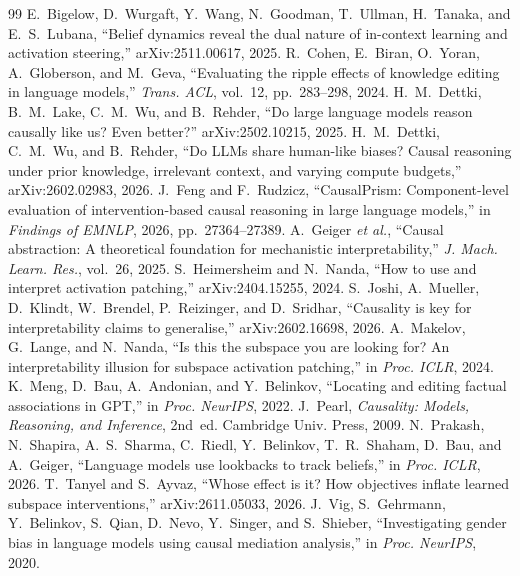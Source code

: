 \documentclass[conference]{IEEEtran}
\begin{document}
\begin{thebibliography}{99}\footnotesize
{} E.~Bigelow, D.~Wurgaft, Y.~Wang, N.~Goodman, T.~Ullman, H.~Tanaka, and E.~S.~Lubana, ``Belief dynamics reveal the dual nature of in-context learning and activation steering,'' arXiv:2511.00617, 2025.
 R.~Cohen, E.~Biran, O.~Yoran, A.~Globerson, and M.~Geva, ``Evaluating the ripple effects of knowledge editing in language models,'' \emph{Trans. ACL}, vol.~12, pp.~283--298, 2024.
 H.~M.~Dettki, B.~M.~Lake, C.~M.~Wu, and B.~Rehder, ``Do large language models reason causally like us? Even better?'' arXiv:2502.10215, 2025.
 H.~M.~Dettki, C.~M.~Wu, and B.~Rehder, ``Do LLMs share human-like biases? Causal reasoning under prior knowledge, irrelevant context, and varying compute budgets,'' arXiv:2602.02983, 2026.
 J.~Feng and F.~Rudzicz, ``CausalPrism: Component-level evaluation of intervention-based causal reasoning in large language models,'' in \emph{Findings of EMNLP}, 2026, pp.~27364--27389.
 A.~Geiger \emph{et al.}, ``Causal abstraction: A theoretical foundation for mechanistic interpretability,'' \emph{J. Mach. Learn. Res.}, vol.~26, 2025.
 S.~Heimersheim and N.~Nanda, ``How to use and interpret activation patching,'' arXiv:2404.15255, 2024.
 S.~Joshi, A.~Mueller, D.~Klindt, W.~Brendel, P.~Reizinger, and D.~Sridhar, ``Causality is key for interpretability claims to generalise,'' arXiv:2602.16698, 2026.
 A.~Makelov, G.~Lange, and N.~Nanda, ``Is this the subspace you are looking for? An interpretability illusion for subspace activation patching,'' in \emph{Proc. ICLR}, 2024.
 K.~Meng, D.~Bau, A.~Andonian, and Y.~Belinkov, ``Locating and editing factual associations in GPT,'' in \emph{Proc. NeurIPS}, 2022.
 J.~Pearl, \emph{Causality: Models, Reasoning, and Inference}, 2nd~ed. Cambridge Univ. Press, 2009.
 N.~Prakash, N.~Shapira, A.~S.~Sharma, C.~Riedl, Y.~Belinkov, T.~R.~Shaham, D.~Bau, and A.~Geiger, ``Language models use lookbacks to track beliefs,'' in \emph{Proc. ICLR}, 2026.
 T.~Tanyel and S.~Ayvaz, ``Whose effect is it? How objectives inflate learned subspace interventions,'' arXiv:2611.05033, 2026.
 J.~Vig, S.~Gehrmann, Y.~Belinkov, S.~Qian, D.~Nevo, Y.~Singer, and S.~Shieber, ``Investigating gender bias in language models using causal mediation analysis,'' in \emph{Proc. NeurIPS}, 2020.
\end{thebibliography}
\end{document}
